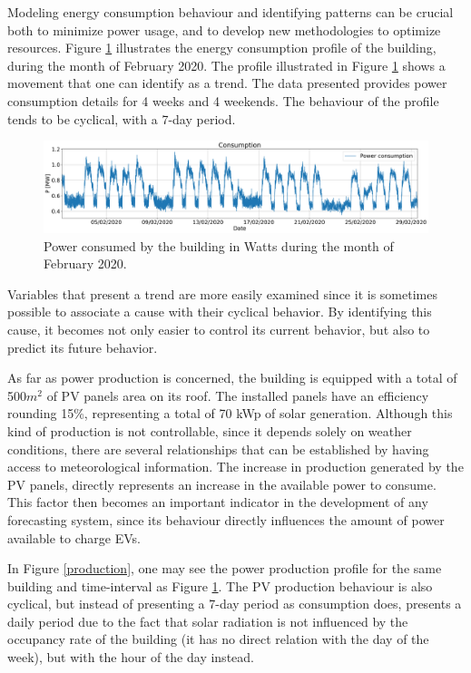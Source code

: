 Modeling energy consumption behaviour and identifying patterns can be crucial both to minimize power usage, and to develop new methodologies to optimize resources. Figure \ref{consumption} illustrates the energy consumption profile of the building, during the month of February 2020. The profile illustrated in Figure \ref{consumption} shows a movement that one can identify as a trend. The data presented provides power consumption details for 4 weeks and 4 weekends. The behaviour of the profile tends to be cyclical, with a 7-day period. 
\begin{figure}[h!]
    \centering
    \begin{center}
    \includegraphics[width=1\textwidth]{Images/power_consumption.png}
    \caption{Power consumed by the building in Watts during the month of February 2020.}
    \label{consumption}
    \end{center}
\end{figure}


Variables that present a trend are more easily examined since it is sometimes possible to associate a cause with their cyclical behavior. By identifying this cause, it becomes not only easier to control its current behavior, but also to predict its future behavior. 

As far as power production is concerned, the building is equipped with a total of 500$m^2$ of \ac{PV} panels area on its roof. The installed panels have an efficiency rounding 15\%, representing a total of 70 kWp of solar generation. Although this kind of production is not controllable, since it depends solely on weather conditions, there are several relationships that can be established by having access to meteorological information. The increase in production generated by the \ac{PV} panels, directly represents an increase in the available power to consume. This factor then becomes an important indicator in the development of any forecasting system, since its behaviour directly influences the amount of power available to charge \ac{EV}s. 

In Figure \ref{production}, one may see the power production profile for the same building and time-interval as Figure \ref{consumption}. The \ac{PV} production behaviour is also cyclical, but instead of presenting a 7-day period as consumption does, presents a daily period due to the fact that solar radiation is not influenced by the occupancy rate of the building (it has no direct relation with the day of the week), but with the hour of the day instead.

